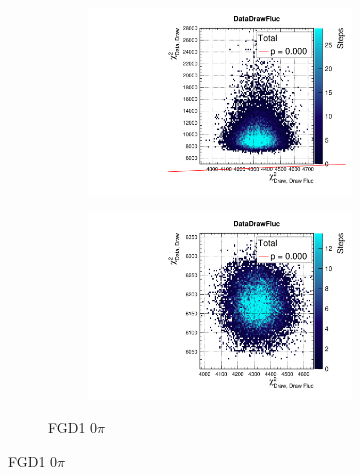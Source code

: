 \begin{figure}[h]
\begin{subfigure}[t]{\textwidth}
\begin{subfigure}[t]{0.24\textwidth}
		\end{subfigure}
		\begin{subfigure}[t]{0.24\textwidth}
			\includegraphics[width=\textwidth, trim={0mm 0mm 0mm 8mm}, clip,page=11]{figures/mach3/2018/data/2018a_FixedCov_RedCov_Mpi_Data_merge_PriorPred_procs}
		\end{subfigure}
		\begin{subfigure}[t]{0.24\textwidth}
			\includegraphics[width=\textwidth, trim={0mm 0mm 0mm 8mm}, clip,page=11]{figures/mach3/2018/data/2018a_FixedCov_RedCov_Mpi_Data_merge_PostPredStore_FullLLH_procs}
		\end{subfigure}
		\caption{FGD1 0$\pi$}
	\end{subfigure}
	

\end{figure}

